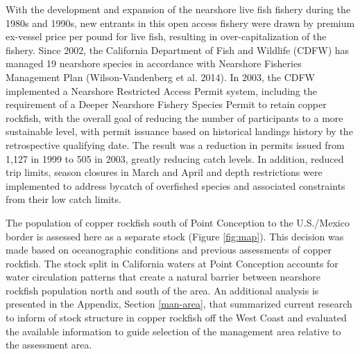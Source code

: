 \documentclass[11pt,
  english,
  a4paper,
]{article}
\begin{document}
\leavevmode\tagmcend\tagstructend\par


With the development and expansion of the nearshore live fish fishery during the 1980s and 1990s, new entrants in this open access fishery were drawn by premium ex-vessel price per pound for live fish, resulting in over-capitalization of the fishery. Since 2002, the California Department of Fish and Wildlife (CDFW) has managed 19 nearshore species in accordance with Nearshore Fisheries Management Plan {(Wilson-Vandenberg et al. 2014)\leavevmode\tagmcend\tagstructend}. In 2003, the CDFW implemented a Nearshore Restricted Access Permit system, including the requirement of a Deeper Nearshore Fishery Species Permit to retain copper rockfish, with the overall goal of reducing the number of participants to a more sustainable level, with permit issuance based on historical landings history by the retrospective qualifying date. The result was a reduction in permits issued from 1,127 in 1999 to 505 in 2003, greatly reducing catch levels. In addition, reduced trip limits, season closures in March and April and depth restrictions were implemented to address bycatch of overfished species and associated constraints from their low catch limits.

\leavevmode\tagmcend\tagstructend\par


The population of copper rockfish south of Point Conception to the U.S./Mexico border is assessed here as a separate stock (Figure \ref{fig:map}). This decision was made based on oceanographic conditions and previous assessments of copper rockfish. The stock split in California waters at Point Conception accounts for water circulation patterns that create a natural barrier between nearshore rockfish population north and south of the area. An additional analysis is presented in the Appendix, Section \ref{man-area}, that summarized current research to inform of stock structure in copper rockfish off the West Coast and evaluated the available information to guide selection of the management area relative to the assessment area.

\leavevmode\tagmcend\tagstructend\par

\end{document}

